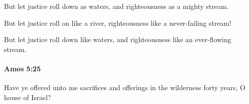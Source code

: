 			\begin{versebox}
					\item[BHS] 
					\item[LXX] 
					\item[ASV] But let justice roll down as waters, and righteousness as a mighty stream.
					\item[NIV] But let justice roll on like a river, righteousness like a never-failing stream!
					\item[NRSV] But let justice roll down like waters, and righteousness like an ever-flowing stream.
			\end{versebox}

		\paragraph{Amos 5:25} %
			\label{AMOS-5-25}

			Have ye offered unto me sacrifices and offerings in the wilderness forty years, O house of Israel?

